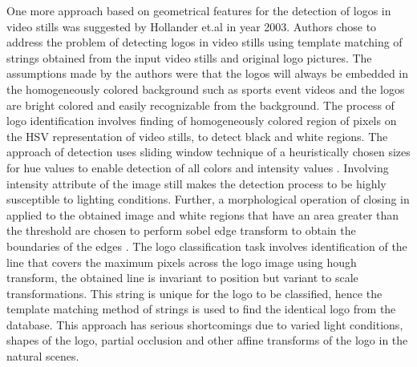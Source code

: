 \begin{itemize}
 One more approach based on geometrical features for the detection of logos in video stills was suggested by Hollander et.al \cite{den2003logo} in year 2003. Authors chose to address the problem of detecting logos in video stills using template matching of strings obtained from the input video stills and original logo pictures. The assumptions made by the authors were that the logos will always be embedded in the homogeneously colored background such as sports event videos and the logos are bright colored and easily recognizable from the background\cite{den2003logo}. The process of logo identification involves finding of homogeneously colored region of pixels on the HSV representation of video stills, to detect black and white regions. The approach of detection uses sliding window technique of a heuristically chosen sizes for hue values to enable detection of all colors and intensity values \cite{den2003logo}. Involving intensity attribute of the image still makes the detection process to be highly susceptible to lighting conditions. Further, a morphological operation of closing in applied to the obtained image and white regions that have an area greater than the threshold are chosen to perform sobel edge transform to obtain the boundaries of the edges \cite{den2003logo}. The logo classification task involves identification of the line that covers the maximum pixels across the logo image using hough transform, the obtained line is invariant to position but variant to scale transformations. This string is unique for the logo to be classified, hence the template matching method of strings is used to find the identical logo from the database. This approach has serious shortcomings due to varied light conditions, shapes of the logo, partial occlusion and other affine transforms of the logo in the natural scenes. 
\end{itemize}